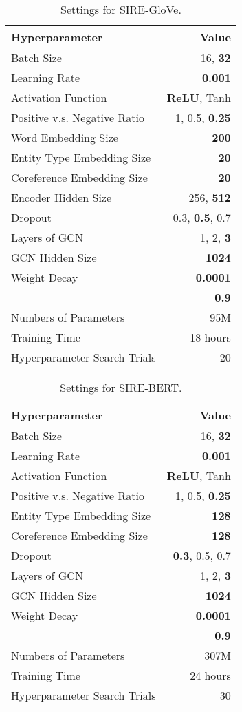 \documentclass[11pt,a4paper]{article}
\begin{document}
\begin{table}[!htbp]
\centering
\begin{tabular}{lr}
\hline
\textbf{Hyperparameter} & Value \\
\hline
Batch Size &  16, \textbf{32} \\
Learning Rate  & \textbf{0.001}  \\
Activation Function & \textbf{ReLU}, Tanh \\
Positive v.s. Negative Ratio & 1, 0.5, \textbf{0.25} \\
Word Embedding Size  & \textbf{200}\\
Entity Type Embedding Size & \textbf{20}  \\
Coreference Embedding Size & \textbf{20}  \\
Encoder Hidden Size &  256, \textbf{512} \\
Dropout &  0.3, \textbf{0.5}, 0.7 \\
Layers of GCN & 1, 2, \textbf{3} \\
GCN Hidden Size & \textbf{1024} \\
Weight Decay & \textbf{0.0001} \\
 & \textbf{0.9} \\
\hline \hline
Numbers of Parameters & 95M \\ Training Time & 18 hours \\
Hyperparameter Search Trials & 20 \\
\hline
\end{tabular}
\caption{Settings for SIRE-GloVe.}
\label{tab:hyperparam1}
\end{table}


\begin{table}[!htbp]
\centering
\begin{tabular}{lr}
\hline
\textbf{Hyperparameter} & Value \\
\hline
Batch Size & 16, \textbf{32} \\
Learning Rate  & \textbf{0.001}  \\
Activation Function & \textbf{ReLU}, Tanh \\
Positive v.s. Negative Ratio & 1, 0.5, \textbf{0.25} \\
Entity Type Embedding Size & \textbf{128} \\
Coreference Embedding Size & \textbf{128} \\
Dropout & \textbf{0.3}, 0.5, 0.7 \\
Layers of GCN & 1, 2, \textbf{3} \\
GCN Hidden Size & \textbf{1024} \\
Weight Decay & \textbf{0.0001} \\
 & \textbf{0.9} \\
\hline \hline
Numbers of Parameters & 307M \\ Training Time & 24 hours \\
Hyperparameter Search Trials & 30 \\
\hline
\end{tabular}
\caption{Settings for SIRE-BERT.}
\label{tab:hyperparam2}
\end{table}

 
\end{document}
